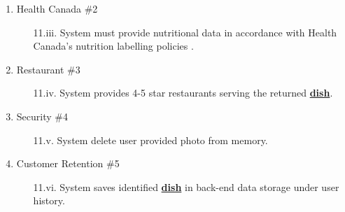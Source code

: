 \documentclass[]{article}
\begin{document}
\begin{enumerate}[{\bf BE1.}]
\begin{enumerate}[{\bf VP1.}]
			\item Health Canada  \#2
				\begin{enumerate}
					\item[11.iii.] System must provide nutritional data in accordance with Health Canada's nutrition labelling policies \cite{CanadaNutrition}.
				\end{enumerate}
			\item Restaurant \#3
				\begin{enumerate}
					\item[11.iv.] System provides 4-5 star restaurants serving the returned \hyperref[Dish]{\textbf{dish}}.
				\end{enumerate}
			\item Security \#4 
				\begin{enumerate}
					\item[11.v.] System delete user provided photo from memory.
				\end{enumerate}
			\item Customer Retention \#5
				\begin{enumerate}
					\item[11.vi.] System saves identified \hyperref[Dish]{\textbf{dish}} in back-end data storage under user history.
				\end{enumerate}
		\end{enumerate}


\end{enumerate}
\end{document}
